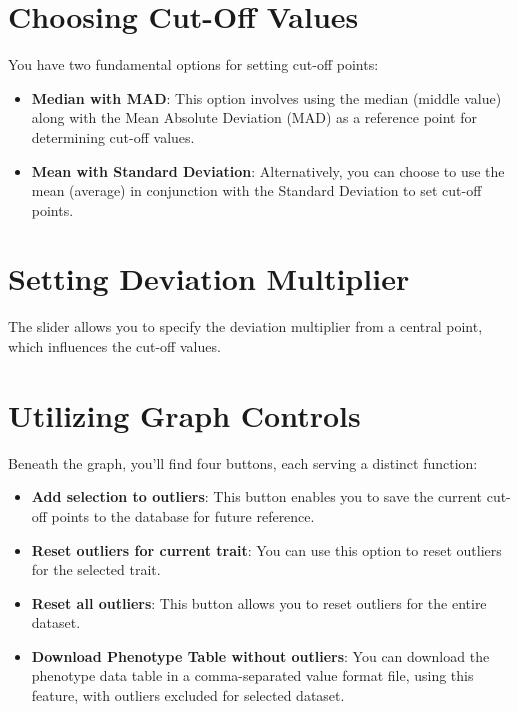 \documentclass[
  12pt,
]{book}
\providecommand{\tightlist}{%
  \setlength{\itemsep}{0pt}\setlength{\parskip}{0pt}}
\begin{document}
\hypertarget{choosing-cut-off-values}{%
\section{Choosing Cut-Off Values}\label{choosing-cut-off-values}}

You have two fundamental options for setting cut-off points:

\begin{itemize}
\tightlist
\item
  \textbf{Median with MAD}: This option involves using the median (middle value) along with the Mean Absolute Deviation (MAD) as a reference point for determining cut-off values.
\item
  \textbf{Mean with Standard Deviation}: Alternatively, you can choose to use the mean (average) in conjunction with the Standard Deviation to set cut-off points.
\end{itemize}

\hypertarget{setting-deviation-multiplier}{%
\section{Setting Deviation Multiplier}\label{setting-deviation-multiplier}}

The slider allows you to specify the deviation multiplier from a central point, which influences the cut-off values.

\hypertarget{utilizing-graph-controls}{%
\section{Utilizing Graph Controls}\label{utilizing-graph-controls}}

Beneath the graph, you'll find four buttons, each serving a distinct function:

\begin{itemize}
\tightlist
\item
  \textbf{Add selection to outliers}: This button enables you to save the current cut-off points to the database for future reference.
\item
  \textbf{Reset outliers for current trait}: You can use this option to reset outliers for the selected trait.
\item
  \textbf{Reset all outliers}: This button allows you to reset outliers for the entire dataset.
\item
  \textbf{Download Phenotype Table without outliers}: You can download the phenotype data table in a comma-separated value format file, using this feature, with outliers excluded for selected dataset.
\end{itemize}
\end{document}
